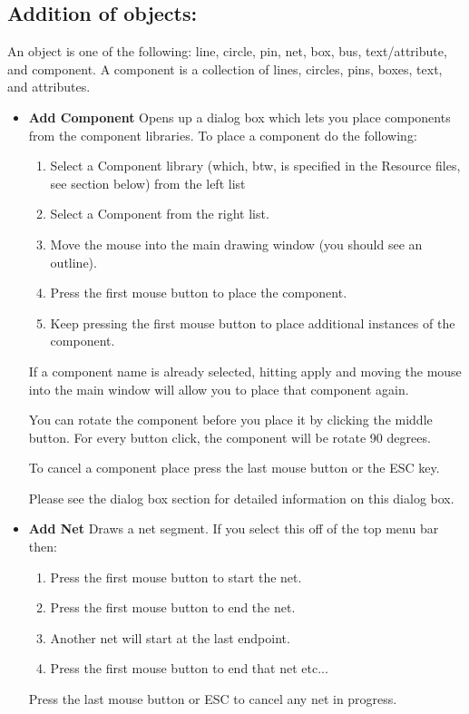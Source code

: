 \documentclass{article}
\begin{document}
\subsection{Addition of objects:}
An object is one of the following: line, circle, pin, net, box, bus,
text/attribute, and component.  A component is a collection of lines,
circles, pins, boxes, text, and attributes.
\begin{itemize}
\item {\bf Add Component} Opens up a dialog box which lets you place
  components from the component libraries.  To place a component do
  the following:
\begin{enumerate}
\item Select a Component library (which, btw, is specified in the
  Resource files, see section below) from the left list

\item Select a Component from the right list.
  
\item Move the mouse into the main drawing window (you should see an
  outline).
  
\item Press the first mouse button to place the component.
  
\item Keep pressing the first mouse button to place additional
  instances of the component.

\end{enumerate}

If a component name is already selected, hitting apply and moving the
mouse into the main window will allow you to place that component
again.

You can rotate the component before you place it by clicking the
middle button.  For every button click, the component will be rotate
90 degrees.

To cancel a component place press the last mouse button or the ESC
key.

Please see the dialog box section for detailed information on this
dialog box.

\item {\bf Add Net} Draws a net segment.  If you select this off of
  the top menu bar then:
\begin{enumerate}
\item Press the first mouse button to start the net.
\item Press the first mouse button to end the net.
\item Another net will start at the last endpoint.
\item Press the first mouse button to end that net etc...
\end{enumerate}
Press the last mouse button or ESC to cancel any net in progress.


\end{itemize}
\end{document}
